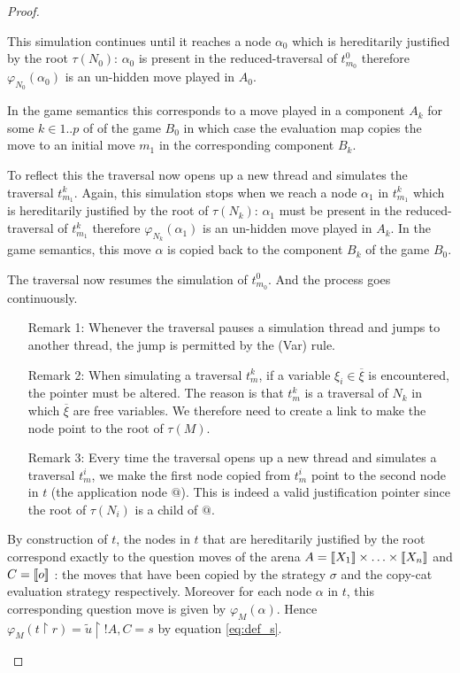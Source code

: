 \begin{proof}
\begin{itemize}
    This simulation continues until it reaches a node $\alpha_0$ which is hereditarily justified by the root
    $\tau(N_0)$: $\alpha_0$ is present in the
    reduced-traversal of $t^0_{m_0}$ therefore $\varphi_{N_0}(\alpha_0)$ is an un-hidden move played in $A_0$.

    In the game semantics this corresponds to a move played in a component $A_k$ for some $k\in 1..p$ of
    of the game $B_0$ in which case the evaluation map copies the move to an initial move $m_1$ in the corresponding component $B_k$.

    To reflect this the traversal now opens up a new thread and
    simulates the traversal $t^k_{m_1}$.
    Again, this simulation stops when we reach a node
    $\alpha_1$ in $t^k_{m_1}$ which is hereditarily justified by the root of
    $\tau(N_k)$: $\alpha_1$ must be present in the reduced-traversal
    of $t^k_{m_1}$ therefore $\varphi_{N_k}(\alpha_1)$ is an un-hidden move played in $A_k$.
    In the game semantics, this move $\alpha$ is copied
    back to the component $B_k$ of the game $B_0$.

    The traversal now resumes the simulation of $t^0_{m_0}$. And the
    process goes continuously.

    \begin{itemize}
    \item[Remark 1:] Whenever the traversal pauses a simulation thread and
    jumps to another thread, the jump
    is permitted by the (Var) rule.

    \item[Remark 2:] When simulating a traversal $t^k_{m}$, if a variable
     $\xi_i \in \overline{\xi}$ is encountered, the pointer must be
     altered. The reason is that $t^k_{m}$ is a traversal of $N_k$ in which $\overline{\xi}$ are free
     variables. We therefore need to create a link to make the node point to the root of $\tau(M)$.

    \item[Remark 3:]Every time the traversal opens up a new thread and simulates a
    traversal $t^i_{m}$, we make the first node copied from $t^i_{m}$ point to the
    second node in $t$ (the application node $@$). This is indeed a valid justification pointer since the root of $\tau(N_i)$ is a child of $@$.
    \end{itemize}


    By construction of  $t$, the nodes in $t$ that are hereditarily justified
    by the root correspond exactly to the question moves of the arena $A = {[\![ X_1 ]\!]} \times \ldots \times {[\![X_n ]\!]}$ and $C = {[\![ o ]\!]}$ :
    the moves that have been copied by the strategy $\sigma$ and the copy-cat evaluation strategy respectively. Moreover for each node $\alpha$ in $t$, this corresponding question move is given by
    $\varphi_M(\alpha)$. Hence $\varphi_M(t \upharpoonright r) = \tilde{u} \upharpoonright !A, C = s$ by equation \ref{eq:def_s}.


\end{itemize}
\end{proof}

